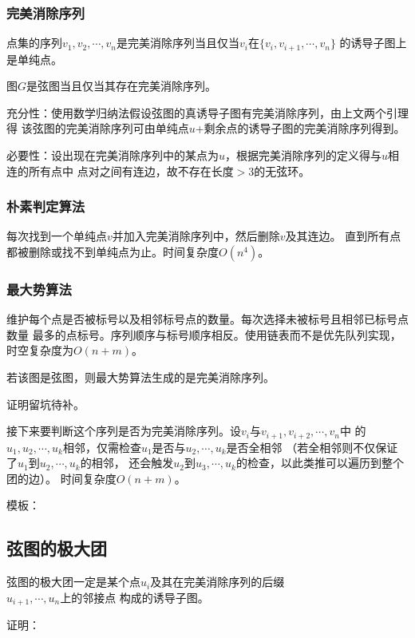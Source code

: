 \subsubsection{完美消除序列}
点集的序列$v_1,v_2,\cdots,v_n$是完美消除序列当且仅当$v_i$在$\{v_i,v_{i+1},\cdots,v_n\}$
的诱导子图上是单纯点。
\begin{theorem}
    图$G$是弦图当且仅当其存在完美消除序列。
\end{theorem}
充分性：使用数学归纳法假设弦图的真诱导子图有完美消除序列，由上文两个引理得
该弦图的完美消除序列可由单纯点$u$+剩余点的诱导子图的完美消除序列得到。

必要性：设出现在完美消除序列中的某点为$u$，根据完美消除序列的定义得与$u$相连的所有点中
点对之间有连边，故不存在长度$>3$的无弦环。
\subsubsection{朴素判定算法}
每次找到一个单纯点$v$并加入完美消除序列中，然后删除$v$及其连边。
直到所有点都被删除或找不到单纯点为止。时间复杂度$O(n^4)$。
\subsubsection{最大势算法}
维护每个点是否被标号以及相邻标号点的数量。每次选择未被标号且相邻已标号点数量
最多的点标号。序列顺序与标号顺序相反。使用链表而不是优先队列实现，时空复杂度为$O(n+m)$。

\begin{theorem}
    若该图是弦图，则最大势算法生成的是完美消除序列。
\end{theorem}
证明留坑待补。

接下来要判断这个序列是否为完美消除序列。设$v_i$与${v_{i+1},v_{i+2},\cdots,v_n}$中
的$u_1,u_2,\cdots,u_k$相邻，仅需检查$u_1$是否与$u_2,\cdots,u_k$是否全相邻
（若全相邻则不仅保证了$u_1$到$u_2,\cdots,u_k$的相邻，
还会触发$u_2$到$u_3,\cdots,u_k$的检查，以此类推可以遍历到整个团的边）。
时间复杂度$O(n+m)$。

模板：

\subsection{弦图的极大团}
\begin{theorem}
弦图的极大团一定是某个点$u_i$及其在完美消除序列的后缀\\${u_{i+1},\cdots,u_n}$上的邻接点
构成的诱导子图。
\end{theorem}
证明：

